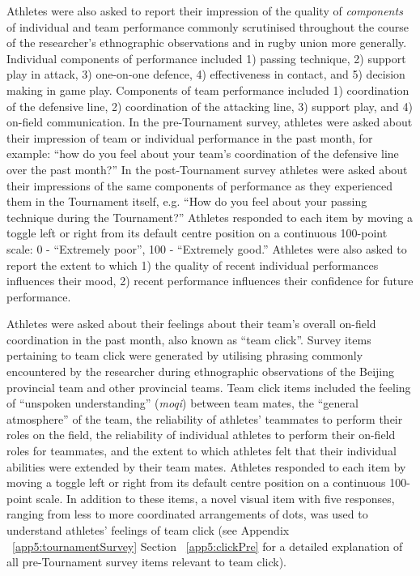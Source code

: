 Athletes were also asked to report their impression of the quality of \textit{components} of individual and team performance commonly scrutinised throughout the course of the researcher's ethnographic observations and in rugby union more generally.  Individual components of performance included 1) passing technique, 2) support play in attack, 3) one-on-one defence, 4) effectiveness in contact, and 5) decision making in game play.  Components of team performance included 1) coordination of the defensive line, 2) coordination of the attacking line, 3) support play, and 4) on-field communication.  In the pre-Tournament survey, athletes were asked about their impression of team or individual performance in the past month, for example: ``how do you feel about your team's coordination of the defensive line over the past month?''  In the post-Tournament survey athletes were asked about their impressions of the same components of performance as they experienced them in the Tournament itself, e.g. ``How do you feel about your passing technique during the Tournament?'' Athletes responded to each item by moving a toggle left or right from its default centre position on a continuous 100-point scale: 0 - ``Extremely poor'', 100 - ``Extremely good.''  Athletes were also asked to report the extent to which 1) the quality of recent individual performances influences their mood, 2) recent performance influences their confidence for future performance.


Athletes were asked about their feelings about their team's overall on-field coordination in the past month, also known as ``team click''. Survey items pertaining to team click were generated by utilising phrasing commonly encountered by the researcher during ethnographic observations of the Beijing provincial team and other provincial teams.  Team click items included the feeling of ``unspoken understanding'' (\textit{moqi}) between team mates, the ``general atmosphere'' of the team, the reliability of athletes' teammates to perform their roles on the field, the reliability of individual athletes to perform their on-field roles for teammates, and the extent to which athletes felt that their individual abilities were extended by their team mates.  Athletes responded to each item by moving a toggle left or right from its default centre position on a continuous 100-point scale. In addition to these items, a novel visual item with five responses, ranging from less to more coordinated arrangements of dots, was used to understand athletes' feelings of team click (see Appendix ~\ref{app5:tournamentSurvey} Section ~\ref{app5:clickPre} for a detailed explanation of all pre-Tournament survey items relevant to team click).

